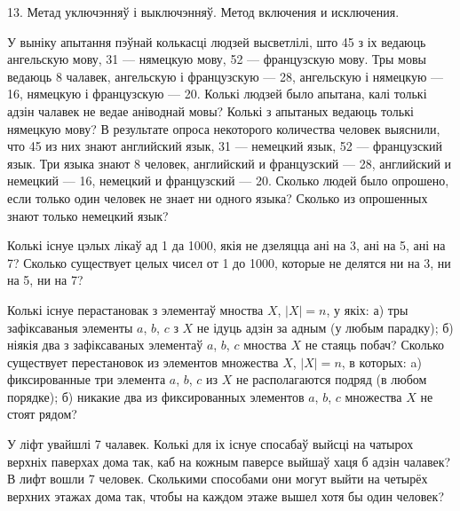 



\biLangHeader
{13. Метад уключэнняў і выключэнняў.}
{Метод включения и исключения.}

\begin{problemList}

\problemItemSimple
{У выніку апытання пэўнай колькасці людзей высветлілі, што 45 з іх
ведаюць ангельскую мову, 31 --- нямецкую мову, 52 --- французскую мову.
Тры мовы ведаюць 8 чалавек, ангельскую і французскую --- 28, ангельскую і нямецкую --- 16,
нямецкую і французскую --- 20. Колькі людзей было апытана, калі толькі адзін чалавек не ведае
аніводнай мовы? Колькі з апытаных ведаюць толькі нямецкую мову?}
{В результате опроса некоторого количества человек выяснили, что 45
из них знают английский язык, 31 --- немецкий язык, 52 --- французский язык.
Три языка знают 8 человек, английский и французский --- 28, английский и
немецкий --- 16, немецкий и французский --- 20. Сколько людей было опрошено,
если только один человек не знает ни одного языка? Сколько из опрошенных
знают только немецкий язык?}

\bigskip

\problemItemSimple
{Колькі існуе цэлых лікаў ад 1 да 1000, якія не дзеляцца ані на 3, ані на 5, ані на 7?}
{Сколько существует целых чисел от 1 до 1000, которые не делятся ни
на 3, ни на 5, ни на 7?}

\bigskip

\problemItemSimple
{Колькі існуе перастановак з элементаў мноства $X$, $|X| = n$, у якіх:
а) тры зафіксаваныя элементы $a$, $b$, $c$ з $X$ не ідуць адзін за адным (у любым парадку);
б) ніякія два з зафіксаваных элементаў $a$, $b$, $c$ мноства $X$ не стаяць побач?}
{Сколько существует перестановок из элементов множества $X$, $|X| = n$,
в которых: a) фиксированные три элемента $a$, $b$, $c$ из $X$ не располагаются
подряд (в любом порядке); б) никакие два из фиксированных элементов $a$, $b$, $c$
множества $X$ не стоят рядом?}

\bigskip

\problemItemSimple
{У ліфт увайшлі 7 чалавек. Колькі для іх існуе спосабаў выйсці на чатырох верхніх паверхах дома так,
каб на кожным паверсе выйшаў хаця б адзін чалавек?}
{В лифт вошли 7 человек. Сколькими способами они могут выйти на четырёх
верхних этажах дома так, чтобы на каждом этаже вышел хотя бы один человек?}

\bigskip


\end{problemList}
